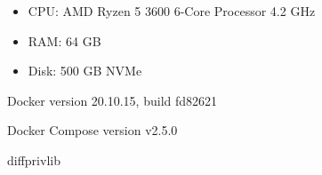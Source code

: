 \begin{itemize}
    \item CPU: AMD Ryzen 5 3600 6-Core Processor 4.2 GHz
    \item RAM: 64 GB
    \item Disk: 500 GB NVMe
\end{itemize}

Docker version 20.10.15, build fd82621

Docker Compose version v2.5.0

diffprivlib \cite{diffprivlib}